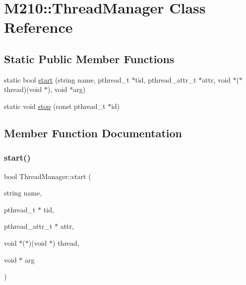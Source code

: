 \hypertarget{class_m210_1_1_thread_manager}{}\section{M210\+:\+:Thread\+Manager Class Reference}
\label{class_m210_1_1_thread_manager}
\subsection*{Static Public Member Functions}
\begin{DoxyCompactItemize}
\item 
static bool \mbox{\hyperlink{class_m210_1_1_thread_manager_a7a8151ede3e7950e8e092f672f8a790d}{start}} (string name, pthread\+\_\+t $\ast$tid, pthread\+\_\+attr\+\_\+t $\ast$attr, void $\ast$($\ast$thread)(void $\ast$), void $\ast$arg)
\item 
static void \mbox{\hyperlink{class_m210_1_1_thread_manager_a10956e3566cbf7050f16b20bf0cf3280}{stop}} (const pthread\+\_\+t $\ast$id)
\end{DoxyCompactItemize}


\subsection{Member Function Documentation}
\mbox{\label{class_m210_1_1_thread_manager_a7a8151ede3e7950e8e092f672f8a790d}} 
\subsubsection{\texorpdfstring{start()}{start()}}
{\footnotesize\ttfamily bool Thread\+Manager\+::start (\begin{DoxyParamCaption}\item[{string}]{name,  }\item[{pthread\+\_\+t $\ast$}]{tid,  }\item[{pthread\+\_\+attr\+\_\+t $\ast$}]{attr,  }\item[{void $\ast$($\ast$)(void $\ast$)}]{thread,  }\item[{void $\ast$}]{arg }\end{DoxyParamCaption})\hspace{0.3cm}{\ttfamily [static]}}


